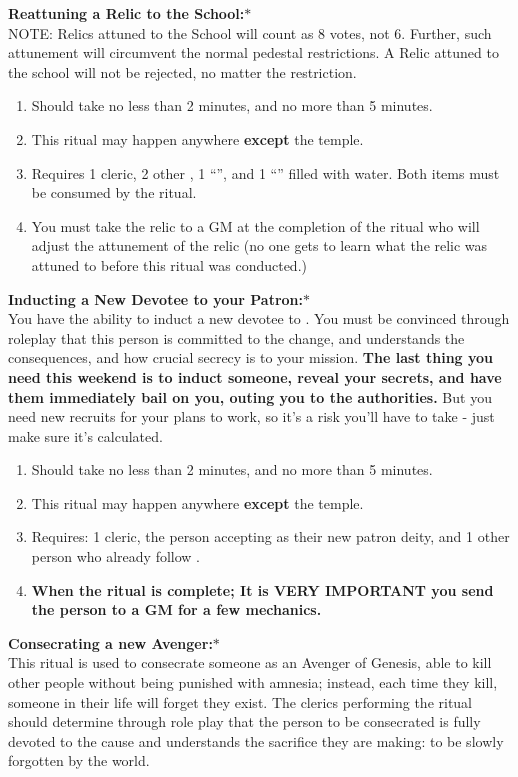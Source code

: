 \documentclass[green]{GL2020}
\begin{document}
\textbf{Reattuning a Relic to the School:}$*$\\
NOTE: Relics attuned to the School will count as 8 votes, not 6. Further, such attunement will circumvent the normal pedestal restrictions. A Relic attuned to the school will not be rejected, no matter the restriction.
  \begin{enumerate}
    \item Should take no less than 2 minutes, and no more than 5 minutes.
    \item This ritual may happen anywhere \textbf{except} the temple.
    \item Requires 1 cleric, 2 other \pGoaties{}, 1 ``\iRitualCandle{}'', and 1 ``\iGlassVial{}'' filled with water.  Both items must be consumed by the ritual.
    \item You must take the relic to a GM at the completion of the ritual who will adjust the attunement of the relic (no one gets to learn what the relic was attuned to before this ritual was conducted.)
  \end{enumerate}
   
\textbf{Inducting a New Devotee to your Patron:}$*$\\
You have the ability to induct a new devotee to \cGenesis{}. You must be convinced through roleplay that this person is committed to the change, and understands the consequences, and how crucial secrecy is to your mission. \textbf{The last thing you need this weekend is to induct someone, reveal your secrets, and have them immediately bail on you, outing you to the authorities.} But you need new recruits for your plans to work, so it's a risk you’ll have to take - just make sure it’s calculated.
  \begin{enumerate}
    \item Should take no less than 2 minutes, and no more than 5 minutes.
    \item This ritual may happen anywhere \textbf{except} the temple.
    \item Requires: 1 cleric, the person accepting \cGenesis{} as their new patron deity, and 1 other person who already follow \cGenesis{}.
	\item \textbf{When the ritual is complete; It is VERY IMPORTANT you send the person to a GM for a few mechanics.}
  \end{enumerate}
  
\textbf{Consecrating a new Avenger:}$*$\\
This ritual is used to consecrate someone as an Avenger of Genesis, able to kill other people without being punished with amnesia; instead, each time they kill, someone in their life will forget they exist. The clerics performing the ritual should determine through role play that the person to be consecrated is fully devoted to the cause and understands the sacrifice they are making: to be slowly forgotten by the world.
\end{document}
